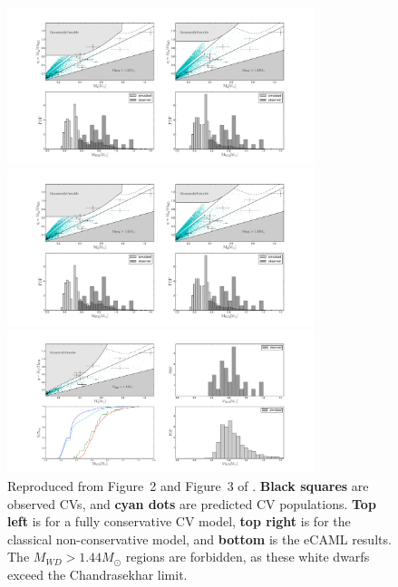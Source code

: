 \begin{figure}
    \centering
    \begin{minipage}[b]{\textwidth}
        \centering
        \includegraphics[width=0.8\textwidth,trim={22cm 12cm 0 0},clip]{figures/introduction/Schrieber_figure1.pdf}
    \end{minipage}
    \begin{minipage}[b]{\textwidth}
        \centering
        \includegraphics[width=0.8\textwidth,trim={0 12cm 22cm 0},clip]{figures/introduction/Schrieber_figure1.pdf}
    \end{minipage}
    \begin{minipage}[b]{\textwidth}
        \centering
        \includegraphics[width=0.8\textwidth,trim={0 12cm 24cm 0},clip]{figures/introduction/Schrieber_figure2.pdf}
    \end{minipage}
    \caption{Reproduced from Figure~2 and Figure~3 of \citet{Schreiber2016}. {\bf Black squares} are observed CVs, and {\bf cyan dots} are predicted CV populations. {\bf Top left} is for a fully conservative CV model, {\bf top right} is for the classical non-conservative model, and {\bf bottom} is the eCAML results. The $M_{WD} > 1.44 M_\odot$ regions are forbidden, as these white dwarfs exceed the Chandrasekhar limit.}
    \label{fig:introduction:Schreiber 2016 figure 2}
\end{figure}

